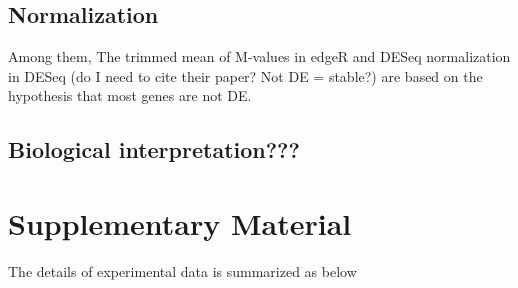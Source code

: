 \documentclass[11pt, a4paper]{article}
\begin{document}
\subsection{Normalization}
 Among them,  The trimmed mean of M-values in edgeR and DESeq normalization in DESeq  (do I need to cite their paper? Not DE = stable?) are based on the hypothesis that most genes are not DE. 
\subsection{Biological interpretation???}
%  
%  

\section{Supplementary Material}
The details of experimental data is summarized as below
\end{document}
